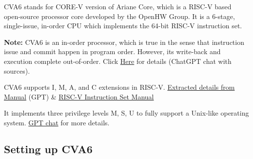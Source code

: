 \documentclass[12pt, a4paper]{article}
\begin{document}
CVA6 stands for CORE-V version of Ariane Core, which is a RISC-V based open-source processor core developed by the OpenHW Group. It is a 6-stage, single-issue, in-order CPU which implements the 64-bit RISC-V instruction set.

\vspace{0.4em}

\textbf{Note:} CVA6 is an in-order processor, which is true in the sense that instruction issue and commit happen in program order. However, its write-back and execution complete out-of-order. Click \href{https://chatgpt.com/s/t_6859b47774988191b23e0e92336e7668}{Here} for details (ChatGPT chat with sources).

\vspace{0.4em}

CVA6 supports I, M, A, and C extensions in RISC-V. \href{https://chatgpt.com/s/t_6859b7c99a1481919e4f0061d34eb39e}{Extracted details from Manual} (GPT) \& \href{https://www2.eecs.berkeley.edu/Pubs/TechRpts/2016/EECS-2016-118.pdf}{RISC-V Instruction Set Manual}

\vspace{0.4em}

It implements three privilege levels M, S, U to fully support a Unix-like operating system.
\href{https://chatgpt.com/s/t_6859b8e04be88191863e1d50b57d0f11}{GPT chat} for more details.

\subsection{Setting up CVA6}
\end{document}
